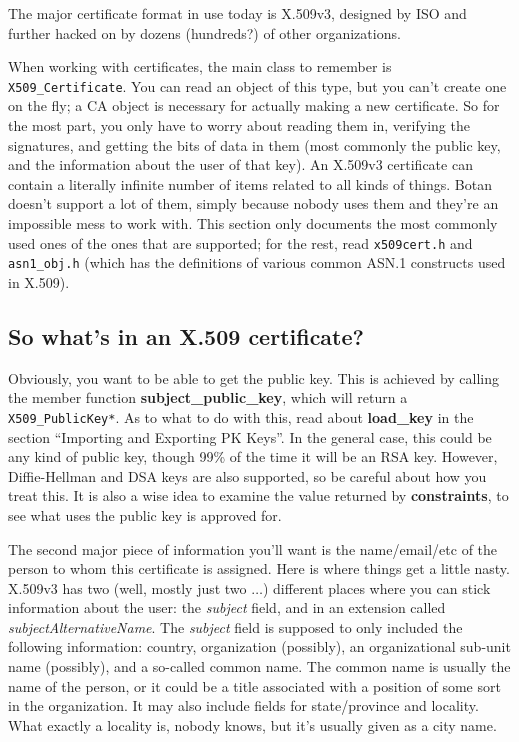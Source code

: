 \documentclass{article}
\newcommand{\filename}[1]{\texttt{#1}}
\newcommand{\function}[1]{\textbf{#1}}
\newcommand{\type}[1]{\texttt{#1}}
\begin{document}
The major certificate format in use today is X.509v3, designed by ISO and
further hacked on by dozens (hundreds?) of other organizations.

When working with certificates, the main class to remember is
\type{X509\_Certificate}. You can read an object of this type, but you can't
create one on the fly; a CA object is necessary for actually making a new
certificate. So for the most part, you only have to worry about reading them
in, verifying the signatures, and getting the bits of data in them (most
commonly the public key, and the information about the user of that key). An
X.509v3 certificate can contain a literally infinite number of items related to
all kinds of things. Botan doesn't support a lot of them, simply because nobody
uses them and they're an impossible mess to work with. This section only
documents the most commonly used ones of the ones that are supported; for the
rest, read \filename{x509cert.h} and \filename{asn1\_obj.h} (which has the
definitions of various common ASN.1 constructs used in X.509).

\subsection{So what's in an X.509 certificate?}

Obviously, you want to be able to get the public key. This is achieved by
calling the member function \function{subject\_public\_key}, which will return
a \type{X509\_PublicKey*}. As to what to do with this, read about
\function{load\_key} in the section ``Importing and Exporting PK Keys''. In the
general case, this could be any kind of public key, though 99\% of the time it
will be an RSA key. However, Diffie-Hellman and DSA keys are also supported, so
be careful about how you treat this. It is also a wise idea to examine the
value returned by \function{constraints}, to see what uses the public key is
approved for.

The second major piece of information you'll want is the name/email/etc of the
person to whom this certificate is assigned. Here is where things get a little
nasty. X.509v3 has two (well, mostly just two $\ldots$) different places where
you can stick information about the user: the \emph{subject} field, and in an
extension called \emph{subjectAlternativeName}. The \emph{subject} field is
supposed to only included the following information: country, organization
(possibly), an organizational sub-unit name (possibly), and a so-called common
name. The common name is usually the name of the person, or it could be a title
associated with a position of some sort in the organization. It may also
include fields for state/province and locality. What exactly a locality is,
nobody knows, but it's usually given as a city name.
\end{document}
